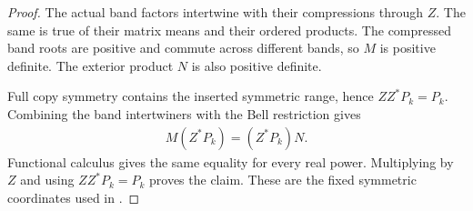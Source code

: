\begin{proof}\leanok
    The actual band factors intertwine with their compressions through
    $Z$. The same is true of their matrix means and their ordered products.
    The compressed band roots are positive and commute across different
    bands, so $M$ is positive definite. The exterior product $N$ is also
    positive definite.

    Full copy symmetry contains the inserted symmetric range, hence
    $ZZ^*P_k=P_k$. Combining the band intertwiners with the Bell restriction
    gives
    \begin{align*}
        M(Z^*P_k)=(Z^*P_k)N.
    \end{align*}
    Functional calculus gives the same equality for every real power.
    Multiplying by $Z$ and using $ZZ^*P_k=P_k$ proves the claim. These are
    the fixed symmetric coordinates used in
    \cite[\texttt{07-comparators.tex}, lines 80--110, 299--308 and 370--381]{OpenAI2026AreaLaw}.
\end{proof}
